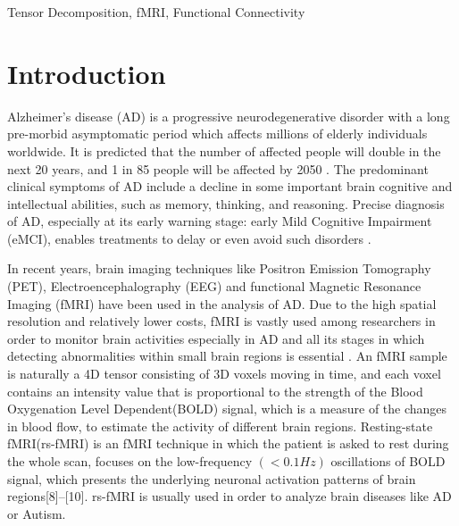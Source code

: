 \documentclass[preprint,12pt]{elsarticle}
\begin{document}
\begin{frontmatter}
		\begin{keyword}
			Tensor Decomposition, fMRI, Functional Connectivity
			
		\end{keyword}
		
	\end{frontmatter}
	
	
	\section{Introduction}
	\label{Intro}
	Alzheimer’s disease (AD) is a progressive neurodegenerative disorder with a long pre-morbid asymptomatic period which affects millions of elderly individuals worldwide\cite{r01}. It is predicted that the number of affected people will double in the next 20 years, and 1 in 85 people will be affected by 2050 \cite{r02}. The predominant clinical symptoms of AD include a decline in some important brain cognitive and intellectual abilities, such as memory, thinking, and reasoning. Precise diagnosis of AD, especially at its early warning stage: early Mild Cognitive Impairment (eMCI), enables treatments to delay or even avoid such disorders \cite{r03}.
	
	In recent years, brain imaging techniques like Positron Emission Tomography (PET)\cite{r21}, Electroencephalography (EEG)\cite{r22}
	and functional Magnetic Resonance Imaging (fMRI)\cite{r23} 
	have been used in the analysis of AD. Due to the high spatial resolution and relatively lower costs, fMRI is vastly used among researchers in order to monitor brain activities especially in AD and all its stages in which detecting abnormalities within small brain regions is essential \cite{r04}. 
	An fMRI sample is naturally a 4D tensor consisting of 3D voxels moving in time, and each voxel contains an intensity value that is proportional to the strength of the Blood Oxygenation Level Dependent(BOLD) signal, which is a measure of the changes in blood flow, to estimate the activity of different brain regions\cite{r07}.
	Resting-state fMRI(rs-fMRI) is an fMRI technique in which the patient is asked to rest during the whole scan, focuses on the low-frequency $\left( < 0.1 Hz \right)$  oscillations of BOLD signal, which presents the underlying neuronal activation patterns of brain regions[8]–[10]. rs-fMRI is usually used in order to analyze brain diseases like AD or Autism\cite{r33,r34}.
	
\end{document}

